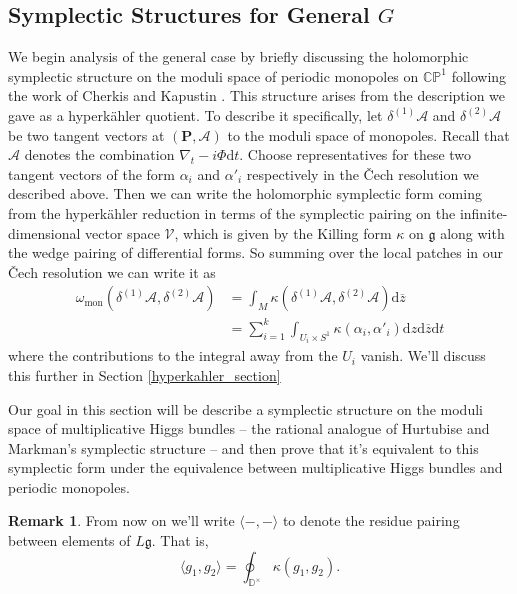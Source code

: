 \documentclass[11pt, oneside, reqno]{amsart}
\theoremstyle{definition} \newtheorem{definition}{Definition}[section]
\theoremstyle{definition} \newtheorem{remark}[definition]{Remark}
\theoremstyle{definition} \newtheorem{remarks}[definition]{Remarks}
\theoremstyle{definition} \newtheorem{question}[definition]{Question}
\theoremstyle{definition} \newtheorem*{note}{Note}
\theoremstyle{definition} \newtheorem{example}[definition]{Example}
\theoremstyle{definition} \newtheorem{examples}[definition]{Examples}
\renewcommand{\gg}{\mathfrak{g}}
\newcommand{\bb}[1]{\mathbb{#1}}
\newcommand{\mr}[1]{\mathrm{#1}}
\newcommand{\mc}[1]{\mathcal{#1}}
\newcommand{\bo}[1]{\boldsymbol{#1}}
\newcommand{\ol}[1]{\overline{#1}}
\renewcommand{\d}{\mathrm{d}}
\begin{document}
\subsection{Symplectic Structures for General $G$} \label{general_symplectic_sec}
We begin analysis of the general case by briefly discussing the holomorphic symplectic structure on the moduli space of periodic monopoles on $\bb{CP}^1$ following the work of Cherkis and Kapustin \cite{CherkisKapustin1, CherkisKapustin3}.  This structure arises from the description we gave as a hyperk\"ahler quotient.  To describe it specifically, let $\delta^{(1)} \mc A$ and $\delta^{(2)} \mc A$ be two tangent vectors at $(\bo P, \mc A)$ to the moduli space of monopoles.  Recall that $\mc A$ denotes the combination $\nabla_t - i\Phi \d t$.  Choose representatives for these two tangent vectors of the form $\alpha_i$ and $\alpha'_i$ respectively  in the \v Cech resolution we described above.  Then we can write the holomorphic symplectic form coming from the hyperk\"ahler reduction in terms of the symplectic pairing on the infinite-dimensional vector space $\mc V$, which is given by the Killing form $\kappa$ on $\gg$ along with the wedge pairing of differential forms.  So summing over the local patches in our \v Cech resolution we can write it as
\begin{align*}
\omega_{\mr{mon}}(\delta^{(1)} \mc A, \delta^{(2)} \mc A) &= \int_{M} \kappa(\delta^{(1)} \mc A, \delta^{(2)} \mc A) \d \ol{z} \\
&= \sum_{i=1}^k \int_{U_i \times S^1} \kappa(\alpha_i, \alpha'_i) \d z \d \ol{z} \d t
\end{align*}
where the contributions to the integral away from the $U_i$ vanish.  We'll discuss this further in Section \ref{hyperkahler_section}

Our goal in this section will be describe a symplectic structure on the moduli space of multiplicative Higgs bundles -- the rational analogue of Hurtubise and Markman's symplectic structure -- and then prove that it's equivalent to this symplectic form under the equivalence between multiplicative Higgs bundles and periodic monopoles.

\begin{remark}
From now on we'll write $\langle - , - \rangle$ to denote the residue pairing between elements of $L\gg$.  That is, 
\[\langle g_1, g_2 \rangle = \oint_{\bb D^\times} \kappa(g_1, g_2).\]
\end{remark}
\end{document}
